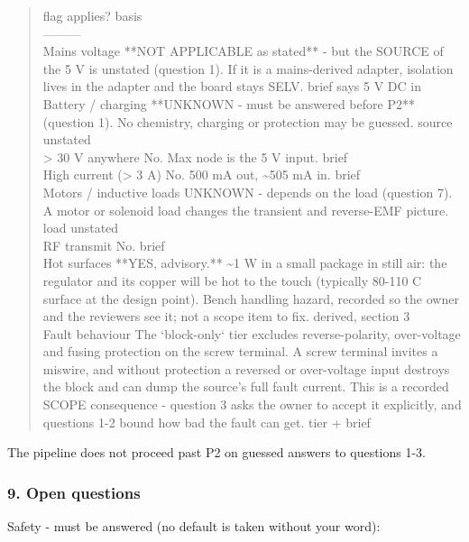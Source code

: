 \documentclass[11pt,a4paper]{article}
\begin{document}
\begin{quote}\small\ttfamily\raggedright
\textbar{} flag \textbar{} applies? \textbar{} basis \textbar{}\\
\textbar{}---\textbar{}---\textbar{}---\textbar{}\\
\textbar{} Mains voltage \textbar{} {*}{*}NOT APPLICABLE as stated{*}{*} - but the SOURCE of the 5 V is unstated (question 1). If it is a mains-derived adapter, isolation lives in the adapter and the board stays SELV. \textbar{} brief says 5 V DC in \textbar{}\\
\textbar{} Battery / charging \textbar{} {*}{*}UNKNOWN - must be answered before P2{*}{*} (question 1). No chemistry, charging or protection may be guessed. \textbar{} source unstated \textbar{}\\
\textbar{} \textgreater{} 30 V anywhere \textbar{} No. Max node is the 5 V input. \textbar{} brief \textbar{}\\
\textbar{} High current (\textgreater{} 3 A) \textbar{} No. 500 mA out, \textasciitilde{}505 mA in. \textbar{} brief \textbar{}\\
\textbar{} Motors / inductive loads \textbar{} UNKNOWN - depends on the load (question 7). A motor or solenoid load changes the transient and reverse-EMF picture. \textbar{} load unstated \textbar{}\\
\textbar{} RF transmit \textbar{} No. \textbar{} brief \textbar{}\\
\textbar{} Hot surfaces \textbar{} {*}{*}YES, advisory.{*}{*} \textasciitilde{}1 W in a small package in still air: the regulator and its copper will be hot to the touch (typically 80-110 C surface at the design point). Bench handling hazard, recorded so the owner and the reviewers see it; not a scope item to fix. \textbar{} derived, section 3 \textbar{}\\
\textbar{} Fault behaviour \textbar{} The `block-only` tier excludes reverse-polarity, over-voltage and fusing protection on the screw terminal. A screw terminal invites a miswire, and without protection a reversed or over-voltage input destroys the block and can dump the source's full fault current. This is a recorded SCOPE consequence - question 3 asks the owner to accept it explicitly, and questions 1-2 bound how bad the fault can get. \textbar{} tier + brief \textbar{}
\end{quote}
The pipeline does not proceed past P2 on guessed answers to questions 1-3.

\subsubsection*{9. Open questions}
Safety - must be answered (no default is taken without your word):
\end{document}
